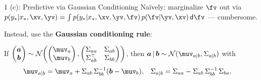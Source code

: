 \documentclass[aspectratio=169]{beamer}
\renewcommand{\N}{\mathcal{N}}
\newcommand{\bv}{\bm{b}}
\newcommand{\ys}{y_{*}}
\newcommand{\xs}{x_{*}}
\newcommand{\av}{\bm{a}}
\begin{document}
\begin{frame}{1 (c): Predictive via Gaussian Conditioning}
	\small
	Na\"ively: marginalize $\fv$ out via $p(\ys|\xs,\xv,\yv)=\int p(\ys|\xs,\xv,\yv,\fv)\,p(\fv|\yv,\xv)\,\mathsf{d}\fv$ --- cumbersome.
	\smallskip

	Instead, use the \textbf{Gaussian conditioning rule}:
	\begin{tcolorbox}[colback=blue!4, colframe=blue!55!black, boxsep=2pt, left=5pt, right=5pt, top=3pt, bottom=3pt, arc=2pt]
	\footnotesize
	If
	$\begin{pmatrix}\av \\ \bv\end{pmatrix}
	\sim \N\!\left(
		\begin{pmatrix}\muv_{a}\\ \muv_{b}\end{pmatrix},
		\begin{pmatrix}\Sigma_{aa} & \Sigma_{ab}\\ \Sigma_{ab}^\top & \Sigma_{bb}\end{pmatrix}
	\right)$,
	then $\av\,|\,\bv \sim \N(\muv_{a|b}, \Sigma_{a|b})$ with
	\begin{align*}
		\muv_{a|b} &= \muv_a + \Sigma_{ab}\,\Sigma_{bb}^{-1}(\bv - \muv_b), &
		\Sigma_{a|b} &= \Sigma_{aa} - \Sigma_{ab}\,\Sigma_{bb}^{-1}\,\Sigma_{ba}.
	\end{align*}
	\end{tcolorbox}
\end{frame}
\end{document}
